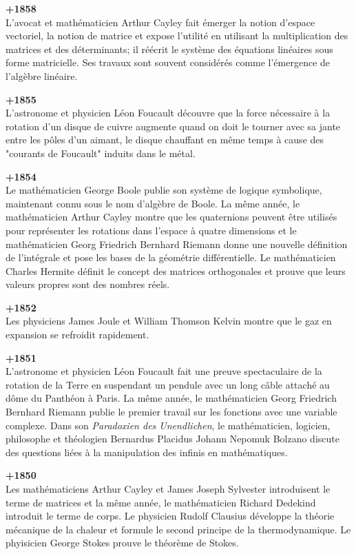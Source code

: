 \textbf{+1858}\\
L'avocat et mathématicien Arthur Cayley fait émerger la notion d'espace vectoriel, la notion de matrice et expose l'utilité en utilisant la multiplication des matrices et des déterminants; il réécrit le système des équations linéaires sous forme matricielle. Ses travaux sont souvent considérés comme l'émergence de l'algèbre linéaire.

\textbf{+1855}\\
L'astronome et physicien Léon Foucault découvre que la force nécessaire à la rotation d'un disque de cuivre augmente quand on doit le tourner avec sa jante entre les pôles d'un aimant, le disque chauffant en même temps à cause des "courants de Foucault" induits dans le métal.

\textbf{+1854}\\
Le mathématicien George Boole publie son système de logique symbolique, maintenant connu sous le nom d'algèbre de Boole. La même année, le mathématicien Arthur Cayley montre que les quaternions peuvent être utilisés pour représenter les rotations dans l'espace à quatre dimensions et le mathématicien Georg Friedrich Bernhard Riemann donne une nouvelle définition de l'intégrale et pose les bases de la géométrie différentielle. Le mathématicien Charles Hermite définit le concept des matrices orthogonales et prouve que leurs valeurs propres sont des nombres réels.

\textbf{+1852}\\
Les physiciens James Joule et William Thomson Kelvin montre que le gaz en expansion se refroidit rapidement.

\textbf{+1851}\\
L'astronome et physicien Léon Foucault fait une preuve spectaculaire de la rotation de la Terre en suspendant un pendule avec un long câble attaché au dôme du Panthéon à Paris. La même année, le mathématicien Georg Friedrich Bernhard Riemann publie le premier travail sur les fonctions avec une variable complexe. Dans son \textit{Paradoxien des Unendlichen}, le mathématicien, logicien, philosophe et théologien Bernardus Placidus Johann Nepomuk Bolzano discute des questions liées à la manipulation des infinis en mathématiques.

\textbf{+1850}\\
Les mathématiciens Arthur Cayley et James Joseph Sylvester introduisent le terme de matrices et la même année, le mathématicien Richard Dedekind introduit le terme de corps. Le physicien Rudolf Clausius développe la théorie mécanique de la chaleur et formule le second principe de la thermodynamique. Le phyisicien George Stokes prouve le théorème de Stokes.

